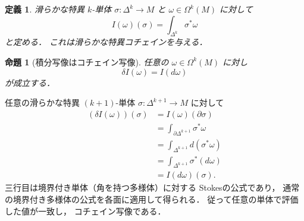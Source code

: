 \documentclass[a5paper,10pt,onecolumn]{jsarticle}
\makeatletter
\theoremstyle{mathnotetheorem}
\newtheorem{definition}[theorem]{定義}
\newtheorem{proposition}[theorem]{命題}
\renewcommand{\proofname}{証明}
\renewenvironment{proof}[1][\proofname]{%
  \par\pushQED{\qed}\normalfont\topsep4\p@\@plus2\p@\relax
  \trivlist\item[\hskip\labelsep\bfseries #1]\ignorespaces
}{\popQED\endtrivlist\@endpefalse}
\makeatother
\begin{document}
\begin{definition}
滑らかな特異 $k$-単体
$\sigma:\Delta^k\to M$ と
$\omega\in\Omega^k(M)$ に対して
\[
 I(\omega)(\sigma)=\int_{\Delta^k}\sigma^*\omega
\]
と定める．
これは滑らかな特異コチェインを与える．
\end{definition}

\begin{proposition}[積分写像はコチェイン写像]\label{prop:integration-chain}
任意の $\omega\in\Omega^k(M)$ に対し
\[
 \delta I(\omega)=I(d\omega)
\]
が成立する．
\end{proposition}
\begin{proof}
任意の滑らかな特異 $(k+1)$-単体
$\sigma:\Delta^{k+1}\to M$ に対して
\begin{align*}
 (\delta I(\omega))(\sigma)
 &=I(\omega)(\partial\sigma)\\
 &=\int_{\partial\Delta^{k+1}}\sigma^*\omega\\
 &=\int_{\Delta^{k+1}}d(\sigma^*\omega)\\
 &=\int_{\Delta^{k+1}}\sigma^*(d\omega)\\
 &=I(d\omega)(\sigma).
\end{align*}
三行目は境界付き単体（角を持つ多様体）に対する
Stokesの公式であり，
通常の境界付き多様体の公式を各面に適用して得られる．
従って任意の単体で評価した値が一致し，
コチェイン写像である．
\end{proof}
\end{document}
